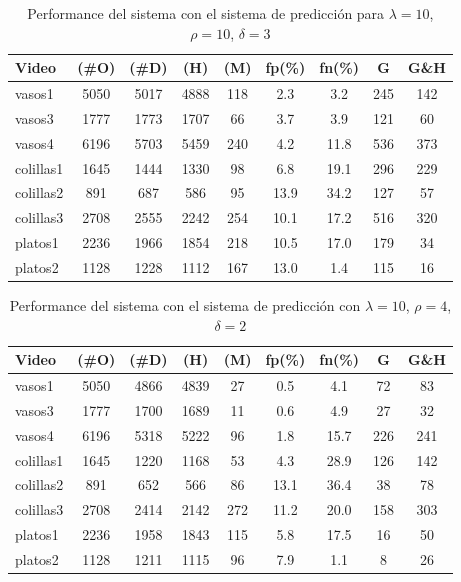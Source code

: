 \begin{table}[htb]
  \begin{tabular}{|l | c | c | c | c | c | c | c | c |}
	\hline  
	\textbf{Video} & \textbf{(\#O)} &  \textbf{(\#D)} & \textbf{(H)} & \textbf{(M)} & \textbf{fp(\%)} & \textbf{fn(\%)} & \textbf{G} & \textbf{G\&H} \\
	\hline
	\hline
	vasos1 & 5050 & 5017 & 4888 & 118 & 2.3 & 3.2  & 245 & 142\\
	vasos3 & 1777 & 1773 & 1707 & 66 & 3.7 & 3.9 & 121 & 60 \\
	vasos4 & 6196 & 5703 & 5459 & 240 & 4.2 & 11.8 & 536 & 373 \\
	\hline
	colillas1 & 1645 & 1444 & 1330 & 98 & 6.8 & 19.1 & 296 & 229 \\
	colillas2 & 891 & 687 & 586 & 95 & 13.9 & 34.2 & 127 & 57 \\
	colillas3 & 2708 & 2555 & 2242 & 254 & 10.1 & 17.2  & 516 & 320\\
	\hline
	platos1 & 2236 & 1966 & 1854 & 218 & 10.5 & 17.0 & 179 & 34\\
	platos2 & 1128 & 1228 & 1112 & 167& 13.0 & 1.4 & 115 & 16\\
	\hline
	\end{tabular}
	\caption{\label{tab:pred} Performance del sistema con el sistema de predicción para 
	$\lambda=10$, $\rho=10$, $\delta=3$ }
\end{table}

\begin{table}[htb]
  \begin{tabular}{|l | c | c | c | c | c | c | c | c |}
	\hline  
	\textbf{Video} & \textbf{(\#O)} &  \textbf{(\#D)} & \textbf{(H)} & \textbf{(M)} & \textbf{fp(\%)} & \textbf{fn(\%)} & \textbf{G} & \textbf{G\&H} \\
	\hline
	\hline
	vasos1 & 5050 & 4866 & 4839 & 27 & 0.5 & 4.1  & 72 & 83\\
	vasos3 & 1777 & 1700 & 1689 & 11 & 0.6 & 4.9 & 27 & 32 \\
	vasos4 & 6196 & 5318 & 5222 & 96 & 1.8 & 15.7 & 226 & 241 \\
	\hline
	colillas1 & 1645 & 1220 & 1168 & 53 & 4.3 & 28.9 & 126 & 142 \\
	colillas2 & 891 & 652 & 566 & 86 & 13.1 & 36.4 & 38 & 78 \\
	colillas3 & 2708 & 2414 & 2142 & 272 & 11.2 & 20.0 & 158 & 303\\
	\hline
	platos1 & 2236 & 1958 & 1843 & 115 & 5.8 & 17.5 & 16 & 50\\
	platos2 & 1128 & 1211 & 1115 & 96 & 7.9 & 1.1 & 8 & 26\\
	\hline
	\end{tabular}
	\caption{\label{tab:pred_2} Performance del sistema con el sistema de predicción con
	$\lambda=10$, $\rho=4$, $\delta=2$}
\end{table}

